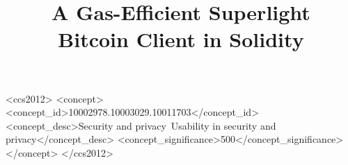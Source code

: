 \documentclass[sigconf, anonymous]{acmart}
\begin{document}
\title{A Gas-Efficient Superlight \\Bitcoin Client in Solidity}


\begin{CCSXML}
<ccs2012>
<concept>
<concept_id>10002978.10003029.10011703</concept_id>
<concept_desc>Security and privacy~Usability in security and privacy</concept_desc>
<concept_significance>500</concept_significance>
</concept>
</ccs2012>
\end{CCSXML}




\maketitle





\end{document}
